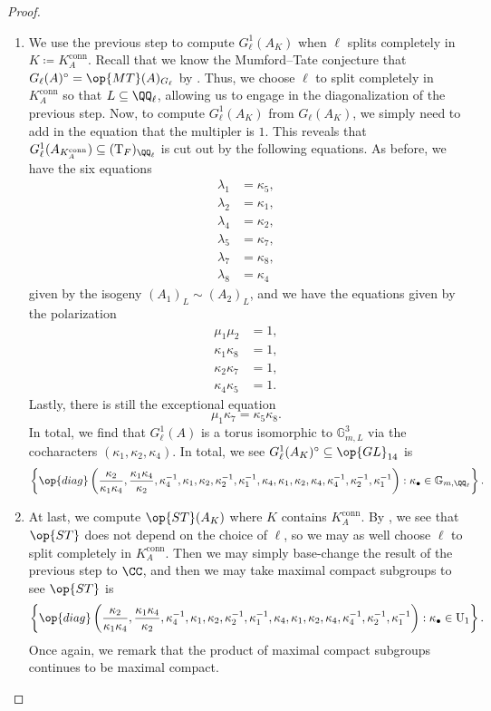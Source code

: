 \documentclass[../thesis.tex]{subfiles}
\begin{document}
\begin{proof}
\begin{enumerate}
		\item We use the previous step to compute $G_\ell^1(A_K)$ when $\ell$ splits completely in $K\coloneqq K_A^{\mathrm{conn}}$. Recall that we know the Mumford--Tate conjecture that $G_\ell(A)^\circ=\op{MT}(A)_{G_\ell}$ by . Thus, we choose $\ell$ to split completely in $K_A^{\mathrm{conn}}$ so that $L\subseteq\QQ_\ell$, allowing us to engage in the diagonalization of the previous step. Now, to compute $G_\ell^1(A_K)$ from $G_\ell(A_K)$, we simply need to add in the equation that the multipler is $1$. This reveals that $G_\ell^1(A_{K_A^{\mathrm{conn}}})\subseteq(\mathrm T_F)_{\QQ_\ell}$ is cut out by the following equations. As before, we have the six equations
		\begin{align*}
			\lambda_1 &= \kappa_5, \\
			\lambda_2 &= \kappa_1, \\
			\lambda_4 &= \kappa_2, \\
			\lambda_5 &= \kappa_7, \\
			\lambda_7 &= \kappa_8, \\
			\lambda_8 &= \kappa_4
		\end{align*}
		given by the isogeny $(A_1)_L\sim (A_2)_L$, and we have the equations given by the polarization
		\begin{align*}
			\mu_1\mu_2 &= 1, \\
			\kappa_1\kappa_8 &= 1, \\
			\kappa_2\kappa_7 &= 1, \\
			\kappa_4\kappa_5 &= 1.
		\end{align*}
		Lastly, there is still the exceptional equation
		\[\mu_1\kappa_7=\kappa_5\kappa_8.\]
		In total, we find that $G_\ell^1(A)$ is a torus isomorphic to $\mathbb G_{m,L}^3$ via the cocharacters $(\kappa_1,\kappa_2,\kappa_4)$. In total, we see $G_\ell^1(A_K)^\circ\subseteq\op{GL}_{14}$ is
		\[\left\{\op{diag}\left(\frac{\kappa_2}{\kappa_1\kappa_4},\frac{\kappa_1\kappa_4}{\kappa_2},\kappa_4^{-1},\kappa_1,\kappa_2,\kappa_2^{-1},\kappa_1^{-1},\kappa_4,\kappa_1,\kappa_2,\kappa_4,\kappa_4^{-1},\kappa_2^{-1},\kappa_1^{-1}\right):\kappa_\bullet\in\mathbb G_{m,\QQ_\ell}\right\}.\]

		\item At last, we compute $\op{ST}(A_K)$ where $K$ contains $K_A^{\mathrm{conn}}$. By , we see that $\op{ST}$ does not depend on the choice of $\ell$, so we may as well choose $\ell$ to split completely in $K_A^{\mathrm{conn}}$. Then we may simply base-change the result of the previous step to $\CC$, and then we may take maximal compact subgroups to see $\op{ST}$ is
		\[\left\{\op{diag}\left(\frac{\kappa_2}{\kappa_1\kappa_4},\frac{\kappa_1\kappa_4}{\kappa_2},\kappa_4^{-1},\kappa_1,\kappa_2,\kappa_2^{-1},\kappa_1^{-1},\kappa_4,\kappa_1,\kappa_2,\kappa_4,\kappa_4^{-1},\kappa_2^{-1},\kappa_1^{-1}\right):\kappa_\bullet\in\mathrm U_1\right\}.\]
		Once again, we remark that the product of maximal compact subgroups continues to be maximal compact.
		\qedhere
	\end{enumerate}
\end{proof}
\end{document}
